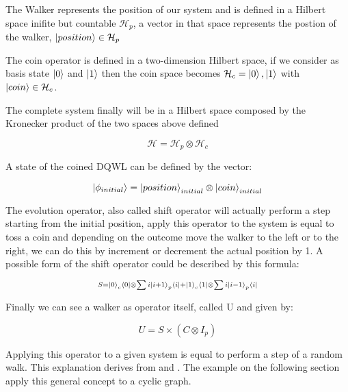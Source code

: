 The Walker represents the position of our system and is defined in a Hilbert space inifite but countable $\mathcal{H}_{p}$, a vector in that space represents 
the postion of the walker, $\ket{position} \in \mathcal{H}_{p}$ 

The coin operator is defined in a two-dimension Hilbert space, if we consider as basis state $\ket{0}$ and $\ket{1}$ then the coin space becomes
$\mathcal{H}_{c} = { \ket{0}, \ket{1} }$ with $\ket{coin} \in \mathcal{H}_{c}$.

The complete system finally will be in a Hilbert space composed by the Kronecker product of the two spaces above defined 

\begin{equation}
    \mathcal{H}=\mathcal{H}_{p}\otimes\mathcal{H}_{c}
\end{equation}

A state of the coined DQWL can be defined by the vector:

\begin{equation}
    \ket{\phi_{initial}} = \ket{position}_{initial} \otimes \ket{coin}_{initial}
\end{equation}

The evolution operator, also called shift operator will actually perform a step starting from the initial position, apply this operator to the
system is equal to toss a coin and depending on the outcome move the walker to the left or to the right, we can do this by increment or decrement
the actual position by 1. A possible form of the shift operator could be described by this formula:

\begin{equation}
    \scriptstyle S = \ket{0}_{c} \bra{0} \otimes \sum{i} \ket{i + 1}_{p} \bra{i} + \ket{1}_{c} \bra{1} \otimes \sum{i} \ket{i - 1}_{p} \bra{i} 
\end{equation}

Finally we can see a walker as operator itself, called U and given by:

\begin{equation}
    U = S \times (C \otimes I_{p})
\end{equation}

Applying this operator to a given system is equal to perform a step of a random walk. This explanation derives from \cite{6812670} and \cite{Kempe_2003}.
The example on the following section apply this general concept to a cyclic graph.





